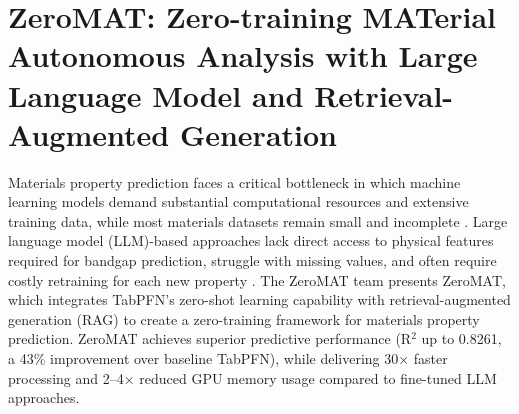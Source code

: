 






\section{ZeroMAT: Zero-training MATerial Autonomous Analysis with Large Language Model and Retrieval-Augmented Generation}



Materials property prediction faces a critical bottleneck in which machine learning models demand substantial computational resources and extensive training data, while most materials datasets remain small and incomplete \cite{schmidt2019recent, butler2018machine}. Large language model (LLM)-based approaches lack direct access to physical features required for bandgap prediction, struggle with missing values, and often require costly retraining for each new property \cite{borlido2020exchange}. The ZeroMAT team presents ZeroMAT, which integrates TabPFN’s zero-shot learning capability \cite{hollmann2025accurate} with retrieval-augmented generation (RAG) \cite{lewis2020retrieval} to create a zero-training framework for materials property prediction. ZeroMAT achieves superior predictive performance (R$^2$ up to 0.8261, a 43\% improvement over baseline TabPFN), while delivering 30$\times$ faster processing and 2--4$\times$ reduced GPU memory usage compared to fine-tuned LLM approaches.


